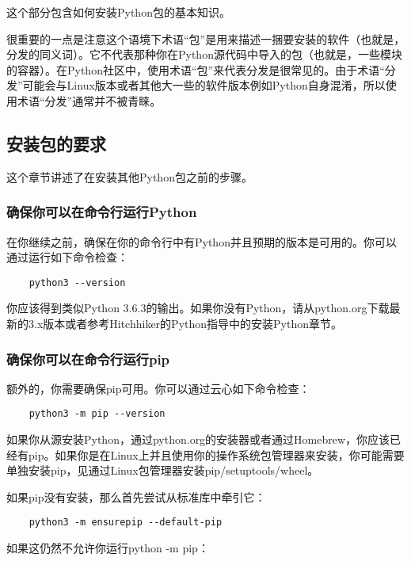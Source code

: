 \documentclass[../package_tutorial.tex]{subfiles}
\begin{document}
这个部分包含如何安装Python包的基本知识。

很重要的一点是注意这个语境下术语“包”是用来描述一捆要安装的软件（也就是，分发的同义词）。它不代表那种你在Python源代码中导入的包（也就是，一些模块的容器）。在Python社区中，使用术语“包”来代表分发是很常见的。由于术语“分发”可能会与Linux版本或者其他大一些的软件版本例如Python自身混淆，所以使用术语“分发”通常并不被青睐。

\subsection{安装包的要求}

这个章节讲述了在安装其他Python包之前的步骤。

\subsubsection{确保你可以在命令行运行Python}

在你继续之前，确保在你的命令行中有Python并且预期的版本是可用的。你可以通过运行如下命令检查：

\begin{lstlisting}
    python3 --version
\end{lstlisting}

你应该得到类似Python 3.6.3的输出。如果你没有Python，请从python.org下载最新的3.x版本或者参考Hitchhiker的Python指导中的安装Python章节。

\subsubsection{确保你可以在命令行运行pip}

额外的，你需要确保pip可用。你可以通过云心如下命令检查：

\begin{lstlisting}
    python3 -m pip --version
\end{lstlisting}

如果你从源安装Python，通过python.org的安装器或者通过Homebrew，你应该已经有pip。如果你是在Linux上并且使用你的操作系统包管理器来安装，你可能需要单独安装pip，见通过Linux包管理器安装pip/setuptools/wheel。

如果pip没有安装，那么首先尝试从标准库中牵引它：

\begin{lstlisting}
    python3 -m ensurepip --default-pip
\end{lstlisting}

如果这仍然不允许你运行python -m pip：
\end{document}
